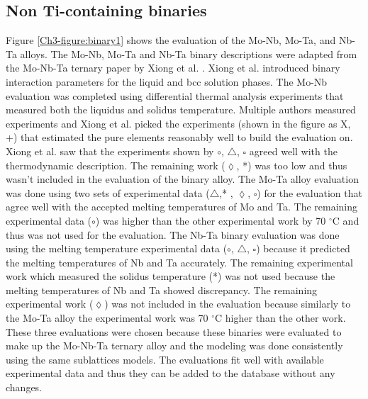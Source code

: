 \subsection{Non Ti-containing binaries}

Figure \ref{Ch3-figure:binary1} shows the evaluation of the Mo-Nb, Mo-Ta, and Nb-Ta alloys. The Mo-Nb, Mo-Ta and Nb-Ta binary descriptions were adapted from the Mo-Nb-Ta ternary paper by Xiong et al. \cite{Xiong2004}. Xiong et al. introduced binary interaction parameters for the liquid and bcc solution phases. The Mo-Nb evaluation was completed using differential thermal analysis experiments that measured both the liquidus and solidus temperature. Multiple authors measured experiments and Xiong et al. picked the experiments (shown in the figure as X, +) that estimated the pure elements reasonably well to build the evaluation on. Xiong et al. saw that the experiments shown by $\circ$, $\triangle$, $\square$ agreed well with the thermodynamic description. The remaining work ($\lozenge$, *) was too low and thus wasn’t included in the evaluation of the binary alloy. The Mo-Ta alloy evaluation was done using two sets of experimental data ($\triangle$,* , $\lozenge$, $\square$) for the evaluation that agree well with the accepted melting temperatures of Mo and Ta. The remaining experimental data ($\circ$) was higher than the other experimental work by 70 $^\circ$C and thus was not used for the evaluation. The Nb-Ta binary evaluation was done using the melting temperature experimental data ($\circ$, $\triangle$, $\square$) because it predicted the melting temperatures of Nb and Ta accurately. The remaining experimental work which measured the solidus temperature (*) was not used because the melting temperatures of Nb and Ta showed discrepancy. The remaining experimental work ($\lozenge$) was not included in the evaluation because similarly to the Mo-Ta alloy the experimental work was 70 $^\circ$C higher than the other work. These three evaluations were chosen because these binaries were evaluated to make up the Mo-Nb-Ta ternary alloy and the modeling was done consistently using the same sublattices models. The evaluations fit well with available experimental data and thus they can be added to the database without any changes.

